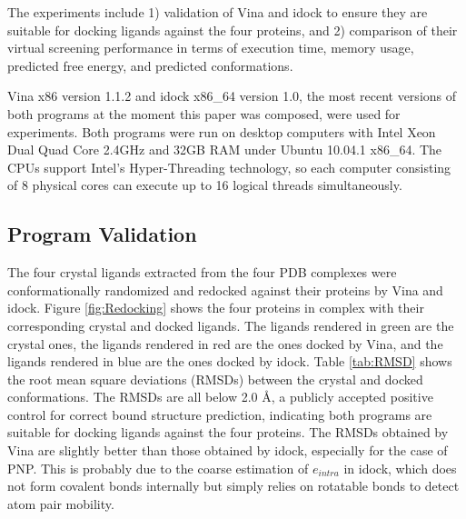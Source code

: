 \documentclass[10pt, conference, compsocconf]{IEEEtran}
\begin{document}
The experiments include 1) validation of Vina and idock to ensure they are suitable for docking ligands against the four proteins, and 2) comparison of their virtual screening performance in terms of execution time, memory usage, predicted free energy, and predicted conformations.

Vina x86 version 1.1.2 and idock x86\_64 version 1.0, the most recent versions of both programs at the moment this paper was composed, were used for experiments. Both programs were run on desktop computers with Intel Xeon Dual Quad Core 2.4GHz and 32GB RAM under Ubuntu 10.04.1 x86\_64. The CPUs support Intel's Hyper-Threading technology, so each computer consisting of 8 physical cores can execute up to 16 logical threads simultaneously.

\subsection{Program Validation}

The four crystal ligands extracted from the four PDB complexes were conformationally randomized and redocked against their proteins by Vina and idock. Figure \ref{fig:Redocking} shows the four proteins in complex with their corresponding crystal and docked ligands. The ligands rendered in green are the crystal ones, the ligands rendered in red are the ones docked by Vina, and the ligands rendered in blue are the ones docked by idock. Table \ref{tab:RMSD} shows the root mean square deviations (RMSDs) between the crystal and docked conformations. The RMSDs are all below 2.0 \AA, a publicly accepted positive control for correct bound structure prediction, indicating both programs are suitable for docking ligands against the four proteins. The RMSDs obtained by Vina are slightly better than those obtained by idock, especially for the case of PNP. This is probably due to the coarse estimation of $e_{intra}$ in idock, which does not form covalent bonds internally but simply relies on rotatable bonds to detect atom pair mobility.
\end{document}
